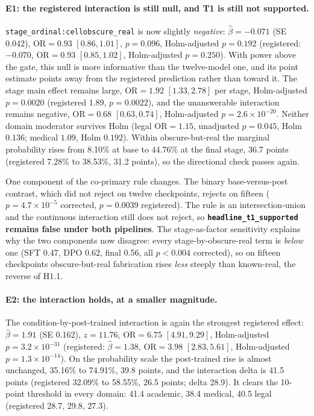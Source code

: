 \paragraph{E1: the registered interaction is still null, and T1 is still not supported.}
\texttt{stage\_ordinal:cellobscure\_real} is now slightly \emph{negative}:
$\hat\beta = -0.071$ (SE 0.042), $\mathrm{OR} = 0.93$ $[0.86, 1.01]$,
$p = 0.096$, Holm-adjusted $p = 0.192$ (registered: $-0.070$, $\mathrm{OR} =
0.93$ $[0.85, 1.02]$, Holm-adjusted $p = 0.250$). With power above the gate, this
null is more informative than the twelve-model one, and its point estimate
points away from the registered prediction rather than toward it. The stage
main effect remains large, $\mathrm{OR} = 1.92$ $[1.33, 2.78]$ per stage,
Holm-adjusted $p = 0.0020$ (registered 1.89, $p = 0.0022$), and the
unanswerable interaction remains negative, $\mathrm{OR} = 0.68$ $[0.63, 0.74]$,
Holm-adjusted $p = 2.6 \times 10^{-20}$. Neither domain moderator survives Holm
(legal $\mathrm{OR} = 1.15$, unadjusted $p = 0.045$, Holm $0.136$; medical
$1.09$, Holm $0.192$). Within obscure-but-real the marginal probability rises
from 8.10\% at base to 44.76\% at the final stage, 36.7 points (registered
7.28\% to 38.53\%, 31.2 points), so the directional check passes again.

One component of the co-primary rule changes. The binary base-versus-post
contrast, which did not reject on twelve checkpoints, rejects on fifteen
($p = 4.7 \times 10^{-5}$ corrected, $p = 0.0039$ registered). The rule is an
intersection-union and the continuous interaction still does not reject, so
\textbf{\texttt{headline\_t1\_supported} remains false under both pipelines}. The
stage-as-factor sensitivity explains why the two components now disagree: every
stage-by-obscure-real term is \emph{below} one (SFT 0.47, DPO 0.62, final 0.56,
all $p < 0.004$ corrected), so on fifteen checkpoints obscure-but-real
fabrication rises \emph{less} steeply than known-real, the reverse of H1.1.

\paragraph{E2: the interaction holds, at a smaller magnitude.}
The condition-by-post-trained interaction is again the strongest registered
effect: $\hat\beta = 1.91$ (SE 0.162), $z = 11.76$, $\mathrm{OR} = 6.75$
$[4.91, 9.29]$, Holm-adjusted $p = 3.2 \times 10^{-31}$ (registered:
$\hat\beta = 1.38$, $\mathrm{OR} = 3.98$ $[2.83, 5.61]$, Holm-adjusted
$p = 1.3 \times 10^{-14}$). On the probability scale the post-trained rise is
almost unchanged, 35.16\% to 74.91\%, 39.8 points, and the interaction delta is
41.5 points (registered 32.09\% to 58.55\%, 26.5 points; delta 28.9). It
clears the 10-point threshold in every domain: 41.4 academic, 38.4 medical,
40.5 legal (registered 28.7, 29.8, 27.3).

